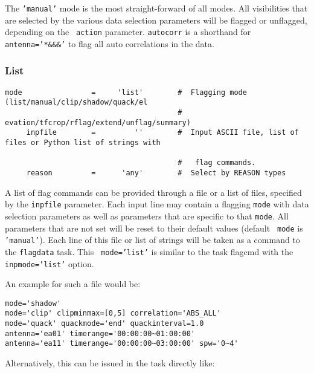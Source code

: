 The {\tt 'manual'} mode is the most straight-forward of all modes. All
visibilities that are selected by the various data selection
parameters will be flagged or unflagged, depending on the {\tt
  action} parameter. {\tt autocorr} is a shorthand for {\tt
  antenna='*\&\&\&'} to flag all auto correlations in the data.


\subsubsection{List}
\label{section:edit.flagdata.mode.list}


\small
\begin{verbatim}
mode                =     'list'        #  Flagging mode (list/manual/clip/shadow/quack/el
                                        #   evation/tfcrop/rflag/extend/unflag/summary)
     inpfile        =         ''        #  Input ASCII file, list of files or Python list of strings with 

                                        #   flag commands.
     reason         =      'any'        #  Select by REASON types
\end{verbatim}
\normalsize

A list of ﬂag commands can be provided through a ﬁle or a list of
files, speciﬁed by the {\tt inpfile} parameter.  Each input line may
contain a flagging {\tt mode} with data selection parameters as well
as parameters that are specific to that {\tt mode}. All parameters
that are not set will be reset to their default values (default {\tt
  mode} is {\tt 'manual'}). Each line of this file or list of strings
will be taken as a command to the {\tt flagdata} task. This {\tt
  mode=’list’} is similar to the task flagcmd with the {\tt
  inpmode=’list’} option.

An example for such a file would be: 

\small
\begin{verbatim}
mode='shadow'
mode='clip' clipminmax=[0,5] correlation='ABS_ALL'
mode='quack' quackmode='end' quackinterval=1.0
antenna='ea01' timerange='00:00:00~01:00:00'
antenna='ea11' timerange='00:00:00~03:00:00' spw='0~4'
\end{verbatim}
\normalsize

Alternatively, this can be issued in the task directly like:

